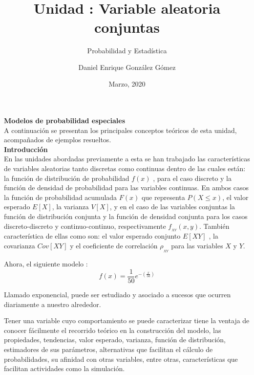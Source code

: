 \documentclass[base=hide,12pt]{elegantbook}
\title{Unidad : Variable aleatoria conjuntas}
\subtitle{Probabilidad y Estadística}
\author{Daniel Enrique González Gómez}
\institute{Pontificia Universidad Javeriana Cali}
\date{Marzo, 2020}
\begin{document}
\textcolor{col4}{\LARGE \bf Modelos de probabilidad especiales}    \\

A continuación se presentan los principales conceptos teóricos de esta unidad, acompañados de ejemplos resueltos. \\

\textcolor{col4}{\LARGE \bf Introducción}\\

En las unidades abordadas previamente a esta se han trabajado las características de variables aleatorias tanto discretas como continuas dentro de  las cuales están: la función de distribución de probabilidad $f(x)$ , para el caso discreto y la función de densidad de probabilidad para las variables continuas. En ambos casos la función de probabilidad acumulada $F(x)$ que representa $P(X \leq x)$, el valor esperado $E[X]$, la varianza $V[X]$, y en el caso de las variables conjuntas la función de distribución conjunta y la función de densidad conjunta para los casos discreto-discreto y continuo-continuo, respectivamente $f_{_{XY}}(x,y)$. También característica de ellas como son: el valor esperado conjunto $E[XY]$ , la covarianza $Cov[XY]$ y el coeficiente de correlación  $\rho_{_{XY}}$ para las variables $X$ y $Y$. 

Ahora, el siguiente modelo :
$$f(x)= \frac{1}{50}e^{-(\frac{x}{50})} $$ 

Llamado exponencial, puede ser estudiado y asociado a sucesos que ocurren diariamente a nuestro alrededor.

Tener una variable cuyo comportamiento se puede caracterizar tiene la ventaja de conocer fácilmente el recorrido teórico en la construcción del modelo, las propiedades, tendencias, valor esperado, varianza, función de distribución, estimadores de sus parámetros, alternativas que facilitan el cálculo de probabilidades, su afinidad con otras variables, entre otras, características que facilitan actividades como la simulación. \\
\end{document}
